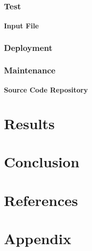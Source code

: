 \documentclass[a4paper, 12pt, nocenter]{thesis}
\begin{document}
			\subsection{Test}
				\subsubsection{Input File}
			\subsection{Deployment}
			\subsection{Maintenance}
				\subsubsection{Source Code Repository}
	\newpage
	\chapter{Results}
	\newpage
	\chapter{Conclusion}
	\newpage
	\chapter{References}
		
	\newpage
	\chapter{Appendix}

  
\end{document}
